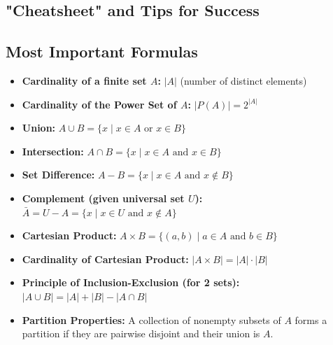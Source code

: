 \documentclass{article}
\begin{document}
\begin{itemize}
\begin{itemize}
\begin{itemize}
\begin{enumerate}
\section{"Cheatsheet" and Tips for Success}

\subsection{Most Important Formulas}
\begin{itemize}
    \item \textbf{Cardinality of a finite set $A$:} $|A|$ (number of distinct elements)
    \item \textbf{Cardinality of the Power Set of $A$:} $|P(A)| = 2^{|A|}$
    \item \textbf{Union:} $A \cup B = \{x \mid x \in A \text{ or } x \in B\}$
    \item \textbf{Intersection:} $A \cap B = \{x \mid x \in A \text{ and } x \in B\}$
    \item \textbf{Set Difference:} $A - B = \{x \mid x \in A \text{ and } x \notin B\}$
    \item \textbf{Complement (given universal set $U$):} $\bar{A} = U - A = \{x \mid x \in U \text{ and } x \notin A\}$
    \item \textbf{Cartesian Product:} $A \times B = \{(a, b) \mid a \in A \text{ and } b \in B\}$
    \item \textbf{Cardinality of Cartesian Product:} $|A \times B| = |A| \cdot |B|$
    \item \textbf{Principle of Inclusion-Exclusion (for 2 sets):} $|A \cup B| = |A| + |B| - |A \cap B|$
    \item \textbf{Partition Properties:} A collection of nonempty subsets of $A$ forms a partition if they are pairwise disjoint and their union is $A$.
\end{itemize}


\end{enumerate}
\end{itemize}
\end{itemize}
\end{itemize}
\end{document}
